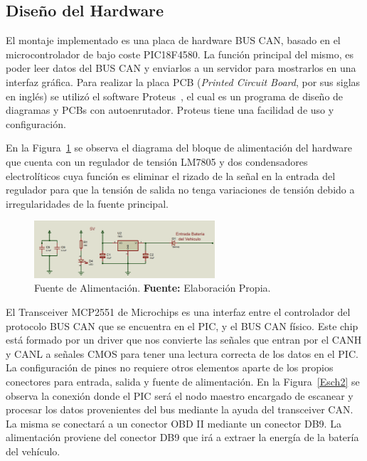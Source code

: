 
\subsection{Diseño del Hardware}
El montaje implementado es una placa de hardware BUS CAN, basado en el microcontrolador de bajo coste PIC18F4580. La función principal del mismo, es poder leer datos del BUS
CAN y enviarlos a un servidor para mostrarlos en una interfaz gráfica. 
Para realizar la placa PCB (\textit{Printed Circuit Board}, por sus siglas en inglés) se utilizó el software Proteus~\cite{pro},  el cual es un programa de diseño de diagramas y PCBs con autoenrutador. 
Proteus tiene una facilidad de uso y configuración.

En la Figura~\ref{Esch1} se observa el diagrama del bloque de alimentación del hardware que cuenta con un regulador de tensión LM7805 y dos condensadores electrolíticos cuya función es eliminar el rizado de la señal en la entrada del regulador para que la tensión de salida no tenga variaciones de tensión debido a irregularidades de la fuente principal. 

\begin{figure}[H]
	\centering
		\includegraphics[width=0.6\textwidth]{./Cap4imagen/Fuente5v_4.png}
	\caption[Fuente de Alimentación.]{Fuente de Alimentación.\textbf{ Fuente:} 
	Elaboración Propia.}
	\label{Esch1} %
\end{figure}




El Transceiver MCP2551 de Microchips es una interfaz entre el controlador del protocolo BUS CAN que se encuentra en el PIC, y el BUS CAN físico. 
Este chip está formado por un driver que nos convierte las señales que entran por el CANH  y CANL a señales CMOS para tener una lectura correcta de los datos en el PIC. 
La configuración de pines no requiere otros elementos aparte de los propios conectores para  entrada, salida y fuente de alimentación. 
En la Figura~\ref{Esch2} se observa la conexión donde el PIC será el nodo maestro encargado de escanear y procesar los datos provenientes del bus mediante la ayuda del transceiver CAN. 
La misma se conectará a un conector OBD II mediante un conector DB9. 
La alimentación proviene del conector DB9 que irá a extraer la energía de la batería del vehículo.


